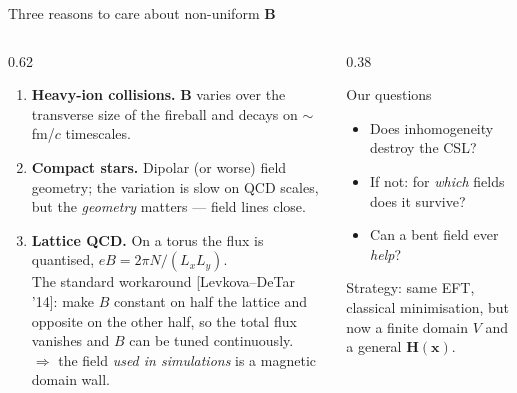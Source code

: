 \documentclass[aspectratio=169,10pt]{beamer}
\newcommand{\B}{\bm{B}}
\newcommand{\Hb}{\bm{H}}
\newcommand{\cit}[1]{{\scriptsize\color{gray}[#1]}}
\begin{document}
\begin{frame}{Three reasons to care about non-uniform $\B$}
\begin{columns}[T,onlytextwidth]
\begin{column}{0.62\textwidth}
\begin{enumerate}
  \item \textbf{Heavy-ion collisions.} $\B$ varies over the transverse size of
        the fireball and decays on $\sim$fm/$c$ timescales.
  \item \textbf{Compact stars.} Dipolar (or worse) field geometry; the
        variation is slow on QCD scales, but the \emph{geometry} matters ---
        field lines close.
  \item \textbf{Lattice QCD.} On a torus the flux is quantised,
        $eB=2\pi N/(L_xL_y)$. \\[1mm]
        The standard workaround \cit{Levkova--DeTar '14}: make $B$ constant on
        half the lattice and \alert{opposite} on the other half, so the total
        flux vanishes and $B$ can be tuned continuously.\\[1mm]
        $\Rightarrow$ the field \emph{used in simulations} is a magnetic
        domain wall.
\end{enumerate}
\end{column}
\begin{column}{0.38\textwidth}
\begin{block}{Our questions}
\begin{itemize}
  \item Does inhomogeneity destroy the CSL?
  \item If not: for \emph{which} fields does it survive?
  \item Can a bent field ever \emph{help}?
\end{itemize}
\end{block}
\vspace{2mm}
{\small Strategy: same EFT, classical minimisation, but now a finite domain $V$
and a general $\Hb(\bm{x})$.}
\end{column}
\end{columns}
\end{frame}
\end{document}
